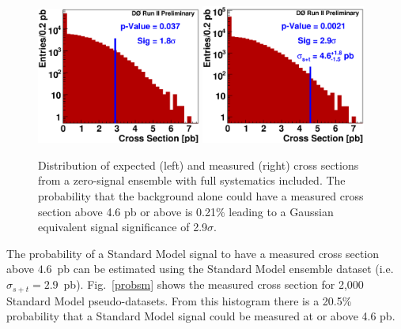 \begin{figure}[!h!tbp]
\begin{center}
\includegraphics[width=0.48\textwidth]
{eps/Limits/ZeroSignalEnsemple_Expected.eps}
\includegraphics[width=0.48\textwidth]
{eps/Limits/ZeroSignalEnsemple_Observed.eps}
\caption{Distribution of expected (left) and measured (right) cross sections from a zero-signal
ensemble with full systematics included. The probability that the background alone could have a measured cross section above 4.6 pb or above is 0.21$\%$ leading to a Gaussian equivalent signal significance of 2.9$\sigma$.}
\label{pValue}
\end{center}
\end{figure}

The probability of a Standard Model signal to have a measured cross section above $4.6$~pb can be estimated using the Standard Model ensemble dataset (i.e. $\sigma_{s+t}=2.9$~pb). Fig.~\ref{probsm} shows the measured cross section for 2,000 Standard Model pseudo-datasets. From this histogram there is a 20.5\% probability that a Standard Model signal could be measured at or above 4.6 pb.


